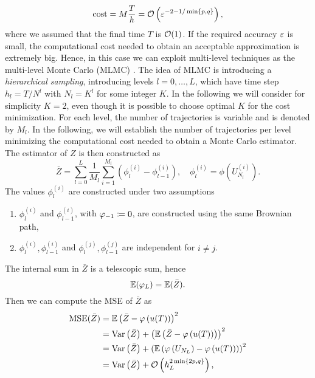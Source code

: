 \begin{equation}
	\mathrm{cost} = M \frac{T}{h} = \mathcal{O}\left(\varepsilon^{-2 - 1/\min\{p, q\}}\right),
\end{equation}
where we assumed that the final time $T$ is $\mathcal{O}(1)$. If the required accuracy $\varepsilon$ is small, the computational cost needed to obtain an acceptable approximation is extremely big. Hence, in this case we can exploit multi-level techniques as the multi-level Monte Carlo (MLMC) \cite{Gil08}. The idea of MLMC is introducing a \textit{hierarchical sampling}, introducing levels $l = 0, \ldots, L$, which have time step $h_l = T / N^l$ with $N_l = K^l$ for some integer $K$. In the following we will consider for simplicity $K = 2$, even though it is possible to choose optimal $K$ for the cost minimization. For each level, the number of trajectories is variable and is denoted by $M_l$. In the following, we will establish the number of trajectories per level minimizing the computational cost needed to obtain a Monte Carlo estimator. The estimator of $Z$ is then constructed as
\begin{equation}
	\bar Z = \sum_{l=0}^L \frac{1}{M_l} \sum_{i = 1}^{M_l}\left( \phi_l^{(i)} - \phi_{l-1}^{(i)} \right), \quad \phi_{l}^{(i)} = \phi \left(U_{N_l}^{(i)}\right).
\end{equation}
The values $\phi_l^{(i)}$ are constructed under two assumptions
\begin{enumerate}
	\item $\phi_l^{(i)}$ and $\phi_{l-1}^{(i)}$, with $\varphi_{-1} \coloneqq 0$, are constructed using the same Brownian path,
	\item $\phi_l^{(i)}, \phi_{l-1}^{(i)}$ and $\phi_l^{(j)}, \phi_{l-1}^{(j)}$ are independent for $i \neq j$.
\end{enumerate}
The internal sum in $\bar Z$ is a telescopic sum, hence
\begin{equation}
	\mathbb{E}(\varphi_L) = \mathbb{E}(\bar Z).
\end{equation}
Then we can compute the MSE of $\bar Z$ as
\begin{equation}
\begin{aligned}
	\operatorname{MSE}(\bar Z) &= \mathbb{E}\left(\bar Z - \varphi\left(u(T)\right)\right)^2 \\
	&= \operatorname{Var}\left(\bar Z\right) + \left(\mathbb{E}\left(\bar Z - \varphi\left(u(T)\right)\right)\right)^2 \\
	&= \operatorname{Var}\left(\bar Z\right) + \left(\mathbb{E}\left(\varphi\left(U_{N_L}\right) - \varphi\left(u(T)\right)\right)\right)^2 \\
	&= \operatorname{Var}\left(\bar Z\right) + \mathcal{O} \left(h_L^{2\min\{2p, q\}}\right),
\end{aligned}
\end{equation}
